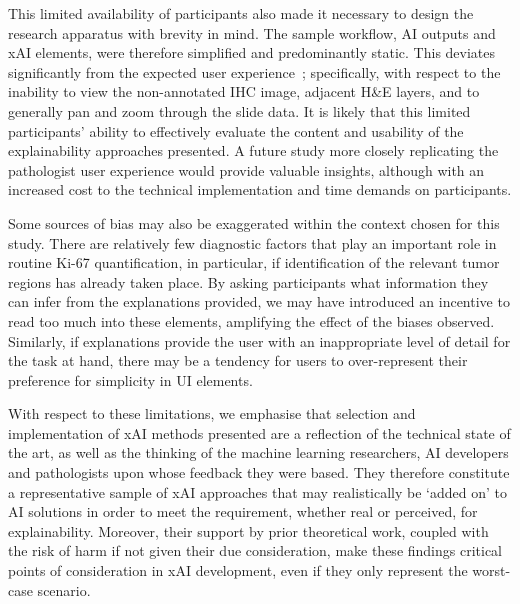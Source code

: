 This limited availability of participants also made it necessary to design the research apparatus with brevity in mind. The sample workflow, AI outputs and xAI elements, were therefore simplified and predominantly static. This deviates significantly from the expected user experience~\cite{Kargl-et-al:2020:PathoWorkflows}; specifically, with respect to the inability to view the non-annotated IHC image, adjacent H\&E layers, and to generally pan and zoom through the slide data. It is likely that this limited participants' ability to effectively evaluate the content and usability of the explainability approaches presented. A future study more closely replicating the pathologist user experience would provide valuable insights, although with an increased cost to the technical implementation and time demands on participants.

Some sources of bias may also be exaggerated within the context chosen for this study. There are relatively few diagnostic factors that play an important role in routine Ki-67 quantification, in particular, if identification of the relevant tumor regions has already taken place. By asking participants what information they can infer from the explanations provided, we may have introduced an incentive to read too much into these elements, amplifying the effect of the biases observed. Similarly, if explanations provide the user with an inappropriate level of detail for the task at hand, there may be a tendency for users to over-represent their preference for simplicity in UI elements.

With respect to these limitations, we emphasise that selection and implementation of xAI methods presented are a reflection of the technical state of the art, as well as the thinking of the machine learning researchers, AI developers and pathologists upon whose feedback they were based. They therefore constitute a representative sample of xAI approaches that may realistically be `added on' to AI solutions in order to meet the requirement, whether real or perceived, for explainability. Moreover, their support by prior theoretical work, coupled with the risk of harm if not given their due consideration, make these findings critical points of consideration in xAI development, even if they only represent the worst-case scenario.



